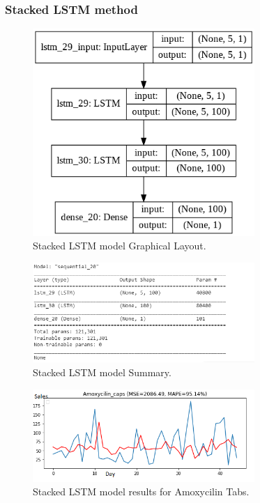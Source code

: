 \documentclass[12pt]{report}
\begin{document}
 
 

  \subsubsection{Stacked LSTM method}

\begin{figure}[H]%
\begin {center}
\includegraphics[width=0.75\textwidth]{StackedLstm.png}
\caption{Stacked LSTM model Graphical Layout.}
\label{fig:ecg}
\end {center}
\end{figure}

\begin{figure}[H]%
\begin {center}
\includegraphics[width=0.75\textwidth]{StackedLstm1.png}
\caption{Stacked LSTM model Summary.}
\label{fig:ecg}
\end {center}
\end{figure}


\begin{figure}[H]%
\begin {center}
\includegraphics[width=0.75\textwidth]{images/stacked (2)A.png}
\caption{Stacked LSTM model results for Amoxycilin Tabs.}
\label{fig:ecg}
\end {center}
\end{figure}
\end{document}

